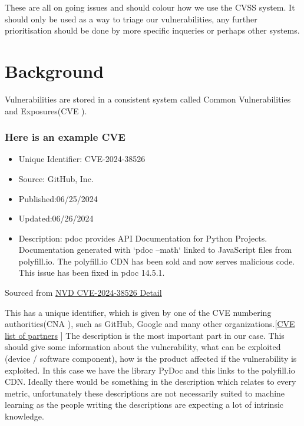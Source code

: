\documentclass[12pt]{article}
\begin{document}
These are all on going issues and should colour how we use the CVSS system. It should only be used as a way to triage our vulnerabilities, any further
prioritisation should be done by more specific inqueries or perhaps other systems.

\section{Background}

Vulnerabilities are stored in a consistent system called Common Vulnerabilities and
Exposures(CVE \cite{CVE}).

\subsubsection*{Here is an example CVE}
\begin{itemize}
	\item   Unique Identifier: CVE-2024-38526
	\item   Source: GitHub, Inc.
	\item   Published:06/25/2024
	\item   Updated:06/26/2024

	\item   Description: pdoc provides API Documentation for Python Projects. Documentation
	      generated with `pdoc --math` linked to JavaScript files from polyfill.io. The polyfill.io
	      CDN has been sold and now serves malicious code. This issue has been fixed in pdoc 14.5.1.

\end{itemize}

\footnotesize{Sourced from \href{https://nvd.nist.gov/vuln/detail/CVE-2024-38526}{NVD CVE-2024-38526
		Detail} \cite{polyfill}} \\
\bigskip

This has a unique identifier, which is given by one of the CVE numbering authorities(CNA \cite{CNA}), such as
GitHub, Google and many other
organizations.[\href{https://www.cve.org/PartnerInformation/ListofPartners}{CVE list of
			partners} \cite{partners}]
The description is the most important part in our case. This should give some information about the
vulnerability, what can be exploited (device / software component), how is the product affected if
the vulnerability is exploited. In this case we have the library PyDoc and this links to the
polyfill.io CDN. Ideally there would be something in the description which relates to every metric,
unfortunately these descriptions are not necessarily suited to machine learning as the people
writing the descriptions are expecting a lot of intrinsic knowledge.
\end{document}
